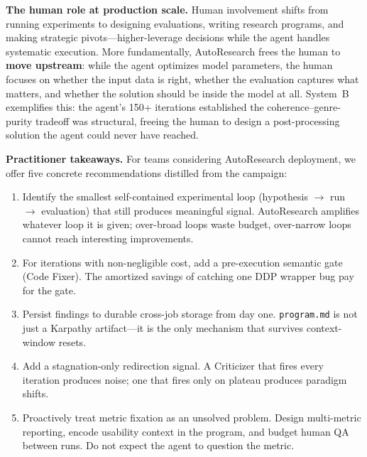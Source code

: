 \documentclass[conference]{IEEEtran}
\begin{document}
\textbf{The human role at production scale.} Human involvement shifts from running experiments to designing evaluations, writing research programs, and making strategic pivots---higher-leverage decisions while the agent handles systematic execution. More fundamentally, AutoResearch frees the human to \textbf{move upstream}: while the agent optimizes model parameters, the human focuses on whether the input data is right, whether the evaluation captures what matters, and whether the solution should be inside the model at all. System~B exemplifies this: the agent's 150+ iterations established the coherence--genre-purity tradeoff was structural, freeing the human to design a post-processing solution the agent could never have reached.

\textbf{Practitioner takeaways.} For teams considering AutoResearch deployment, we offer five concrete recommendations distilled from the campaign:
\begin{enumerate}
\item Identify the smallest self-contained experimental loop (hypothesis $\to$ run $\to$ evaluation) that still produces meaningful signal. AutoResearch amplifies whatever loop it is given; over-broad loops waste budget, over-narrow loops cannot reach interesting improvements.
\item For iterations with non-negligible cost, add a pre-execution semantic gate (Code Fixer). The amortized savings of catching one DDP wrapper bug pay for the gate.
\item Persist findings to durable cross-job storage from day one. \texttt{program.md} is not just a Karpathy artifact---it is the only mechanism that survives context-window resets.
\item Add a stagnation-only redirection signal. A Criticizer that fires every iteration produces noise; one that fires only on plateau produces paradigm shifts.
\item Proactively treat metric fixation as an unsolved problem. Design multi-metric reporting, encode usability context in the program, and budget human QA between runs. Do not expect the agent to question the metric.
\end{enumerate}
\end{document}
